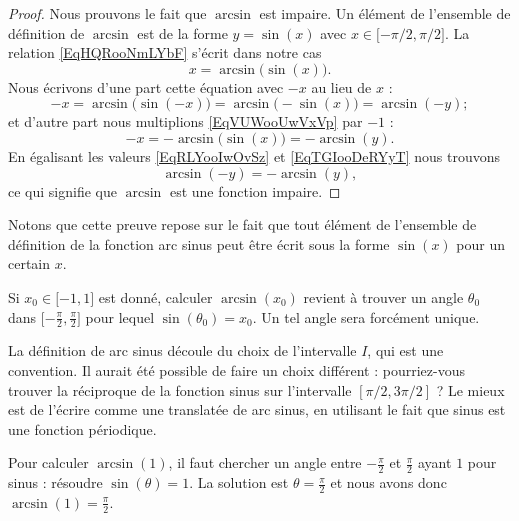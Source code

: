 	\begin{proof}
		Nous prouvons le fait que \( \arcsin\) est impaire. Un élément de l'ensemble de définition de \( \arcsin\) est de la forme \( y=\sin(x)\) avec \( x\in\mathopen[ -\pi/2 , \pi/2 \mathclose]\). La relation \eqref{EqHQRooNmLYbF} s'écrit dans notre cas
		\begin{equation}    \label{EqVUWooUwVxVp}
			x=\arcsin\big( \sin(x) \big).
		\end{equation}
		Nous écrivons d'une part cette équation avec \( -x\) au lieu de \( x\) :
		\begin{equation}    \label{EqRLYooIwOvSz}
			-x=\arcsin\big( \sin(-x) \big)=\arcsin\big( -\sin(x) \big)=\arcsin(-y);
		\end{equation}
		et d'autre part nous multiplions \eqref{EqVUWooUwVxVp} par \( -1\) :
		\begin{equation}    \label{EqTGIooDeRYyT}
			-x=-\arcsin\big( \sin(x) \big)=-\arcsin(y).
		\end{equation}
		En égalisant les valeurs \eqref{EqRLYooIwOvSz} et \eqref{EqTGIooDeRYyT} nous trouvons
		\begin{equation}
			\arcsin(-y)=-\arcsin(y),
		\end{equation}
		ce qui signifie que \( \arcsin\) est une fonction impaire.
	\end{proof}
	Notons que cette preuve repose sur le fait que tout élément de l'ensemble de définition de la fonction arc sinus peut être écrit sous la forme \( \sin(x)\) pour un certain \( x\).

	Si \( x_0\in\mathopen[ -1 , 1 \mathclose]\) est donné, calculer \( \arcsin(x_0)\) revient à trouver un angle \( \theta_0\) dans \( \mathopen[ -\frac{ \pi }{2} , \frac{ \pi }{2} \mathclose]\) pour lequel \( \sin(\theta_0)=x_0\). Un tel angle sera forcément unique.

	\begin{remark}
		La définition de arc sinus découle du choix de l'intervalle \( I\), qui est une convention. Il aurait été possible de faire un choix différent : pourriez-vous trouver la réciproque de la fonction sinus sur l'intervalle \( [\pi/2, 3\pi/2]\) ? Le mieux est de l'écrire comme une translatée de arc sinus, en utilisant le fait que sinus est une fonction périodique.
	\end{remark}

	\begin{example}
		Pour calculer \( \arcsin(1)\), il faut chercher un angle entre \( -\frac{ \pi }{2}\) et \( \frac{ \pi }{ 2 }\) ayant \( 1\) pour sinus : résoudre \( \sin(\theta)=1\). La solution est \( \theta=\frac{ \pi }{2}\) et nous avons donc \( \arcsin(1)=\frac{ \pi }{2}\).
	\end{example}

